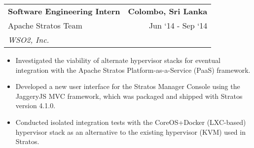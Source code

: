 \documentclass[10pt, letterpaper]{article}
\newcommand{\tabularxwidth}{\textwidth}
\begin{document}
    \begin{minipage}{\tabularxwidth}

        \begin{tabularx}{\tabularxwidth}{X r}
            \textbf{Software Engineering Intern} & \textbf{Colombo, 
        Sri Lanka} \\
            Apache Stratos Team & 
        
    Jun ‘14 - 
    Sep ‘14 \\
            
                
                    \textit{WSO2, Inc.} & \\
                
            
            
        \end{tabularx}

        \begin{itemize}[noitemsep, topsep=3pt, parsep=0pt, partopsep=0pt]
            
                \item 
    Investigated the viability of alternate hypervisor stacks for eventual integration with the Apache Stratos Platform-as-a-Service (PaaS) framework.
            
                \item 
    Developed a new user interface for the Stratos Manager Console using the JaggeryJS MVC framework, which was packaged and shipped with Stratos version 4.1.0.
            
                \item 
    Conducted isolated integration tests with the CoreOS+Docker (LXC-based) hypervisor stack as an alternative to the existing hypervisor (KVM) used in Stratos.
            
        \end{itemize}

        
            \vspace{.5em}
        

    \end{minipage}
    
\end{document}
